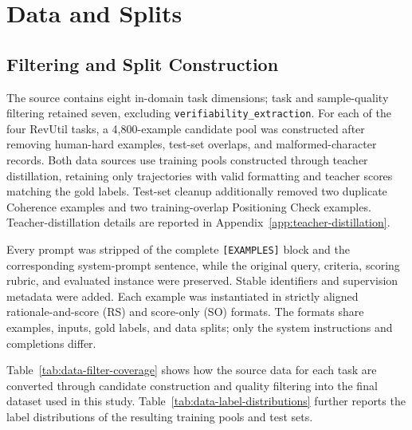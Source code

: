 \section{Data and Splits}
\label{app:dataset}

\subsection{Filtering and Split Construction}

The source contains eight in-domain task dimensions; task and sample-quality
filtering retained seven, excluding \texttt{verifiability\_extraction}.
For each of the four RevUtil tasks, a 4,800-example candidate pool was
constructed after removing human-hard examples, test-set overlaps, and
malformed-character records. Both data sources use training pools constructed
through teacher distillation, retaining only trajectories with valid formatting
and teacher scores matching the gold labels. Test-set cleanup additionally
removed two duplicate Coherence examples and two training-overlap Positioning
Check examples. Teacher-distillation details are reported in
Appendix~\ref{app:teacher-distillation}.

Every prompt was stripped of the complete \texttt{[EXAMPLES]} block and the
corresponding system-prompt sentence, while the original query, criteria,
scoring rubric, and evaluated instance were preserved. Stable identifiers and
supervision metadata were added. Each example was instantiated in strictly
aligned rationale-and-score (RS) and score-only (SO) formats. The formats share
examples, inputs, gold labels, and data splits; only the system instructions
and completions differ.

Table~\ref{tab:data-filter-coverage} shows how the source data for each task
are converted through candidate construction and quality filtering into the
final dataset used in this study. Table~\ref{tab:data-label-distributions}
further reports the label distributions of the resulting training pools and
test sets.

